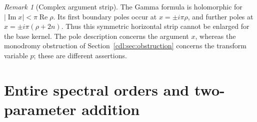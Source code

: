 \documentclass[11pt,letterpaper]{article}
\numberwithin{equation}{section}
\theoremstyle{definition}\newtheorem{definition}[theorem]{Definition}
\theoremstyle{remark}\newtheorem{remark}[theorem]{Remark}
\newcommand{\Rea}{\operatorname{Re}}\newcommand{\Ima}{\operatorname{Im}}
\begin{document}
\begin{remark}[Complex argument strip]
The Gamma formula is holomorphic for
$|\Ima x|<\pi\Rea\rho$. Its first boundary poles occur at
$x=\pm i\pi\rho$, and further poles at $x=\pm i\pi(\rho+2n)$.
Thus this symmetric horizontal strip cannot be enlarged for the base
kernel. The pole description concerns the argument $x$, whereas the
monodromy obstruction of Section~\ref{cdl:sec:obstruction} concerns the
transform variable $p$; these are different assertions.
\end{remark}

\section{Entire spectral orders and two-parameter addition}
\label{cdl:sec:spectral}
\end{document}
